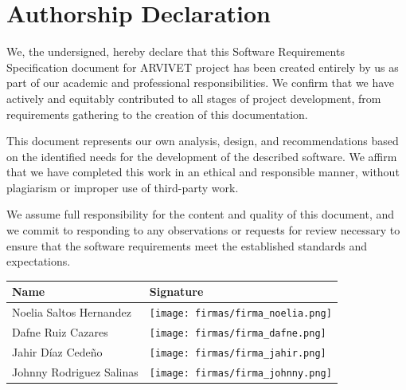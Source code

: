\documentclass[a4paper,12pt]{report}
\begin{document}
	
	\chapter*{Authorship Declaration}
	
	We, the undersigned, hereby declare that this Software Requirements Specification document for ARVIVET project has been created entirely by us as part of our academic and professional responsibilities. We confirm that we have actively and equitably contributed to all stages of project development, from requirements gathering to the creation of this documentation.
	
	This document represents our own analysis, design, and recommendations based on the identified needs for the development of the described software. We affirm that we have completed this work in an ethical and responsible manner, without plagiarism or improper use of third-party work. 
	
	We assume full responsibility for the content and quality of this document, and we commit to responding to any observations or requests for review necessary to ensure that the software requirements meet the established standards and expectations.
	\\[0.5cm]
	\begin{table}[H]
		\centering
		\small
		\begin{tabular}{p{6cm} p{4cm}}
			\hline
			\textbf{Name} & \textbf{Signature} \\
			\hline
			\vspace{0.3cm} Noelia Saltos Hernandez & \vspace{0.02cm} \texttt{[image: firmas/firma\_noelia.png]} \\[0.2cm]
			\hline
			\vspace{0.3cm} Dafne Ruiz Cazares & \vspace{0.02cm} \texttt{[image: firmas/firma\_dafne.png]} \\[0.2cm]
			\hline
			\vspace{0.3cm} Jahir Díaz Cedeño & \vspace{0.04cm} \texttt{[image: firmas/firma\_jahir.png]} \\[0.2cm]
			\hline
			\vspace{0.3cm} Johnny Rodriguez Salinas & \vspace{0.02cm} \texttt{[image: firmas/firma\_johnny.png]} \\[0.2cm]
			\hline
		\end{tabular}
	\end{table}
	
\end{document}
